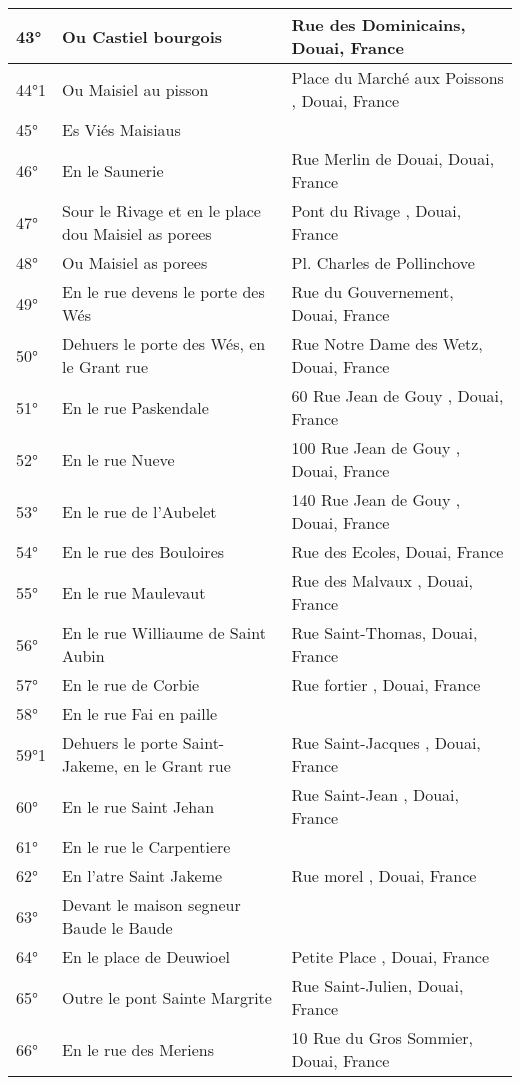 \begin{center}
\begin{longtable}{|l|p{6.5cm}|p{6.5cm}|}
\hline	43°	&	Ou Castiel bourgois	&	 Rue des Dominicains, Douai, France	\\
\hline	44°1	&	Ou Maisiel au pisson	&	Place du Marché aux Poissons , Douai, France	\\
\hline	45°	&	Es Viés Maisiaus	&		\\
\hline	46°	&	En le Saunerie	&	 Rue Merlin de Douai, Douai, France	\\
\hline	47°	&	Sour le Rivage et en le place dou Maisiel as porees	&	Pont du Rivage , Douai, France	\\
\hline	48°	&	Ou Maisiel as porees	&	Pl. Charles de Pollinchove	\\
\hline	49°	&	En le rue devens le porte des Wés	&	 Rue du Gouvernement, Douai, France	\\
\hline	50°	&	Dehuers le porte des Wés, en le Grant rue	&	 Rue Notre Dame des Wetz, Douai, France	\\
\hline	51°	&	En le rue Paskendale	&	60 Rue Jean de Gouy , Douai, France	\\
\hline	52°	&	En le rue Nueve	&	100 Rue Jean de Gouy , Douai, France	\\
\hline	53°	&	En le rue de l'Aubelet	&	140 Rue Jean de Gouy , Douai, France	\\
\hline	54°	&	En le rue des Bouloires	&	Rue des Ecoles, Douai, France	\\
\hline	55°	&	En le rue Maulevaut	&	Rue des Malvaux , Douai, France	\\
\hline	56°	&	En le rue Williaume de Saint Aubin	&	Rue Saint-Thomas, Douai, France	\\
\hline	57°	&	En le rue de Corbie	&	Rue fortier , Douai, France	\\
\hline	58°	&	En le rue Fai en paille	&		\\
\hline	59°1	&	Dehuers le porte Saint-Jakeme, en le Grant rue	&	 Rue Saint-Jacques , Douai, France	\\
\hline	60°	&	En le rue Saint Jehan	&	Rue Saint-Jean , Douai, France	\\
\hline	61°	&	En le rue le Carpentiere	&		\\
\hline	62°	&	En l'atre Saint Jakeme	&	Rue morel , Douai, France	\\
\hline	63°	&	Devant le maison segneur Baude le Baude	&		\\
\hline	64°	&	En le place de Deuwioel	&	Petite Place , Douai, France	\\
\hline	65°	&	Outre le pont Sainte Margrite	&	Rue  Saint-Julien, Douai, France	\\
\hline	66°	&	En le rue des Meriens	&	 10 Rue du Gros Sommier, Douai, France	\\

\end{longtable}
\end{center}
